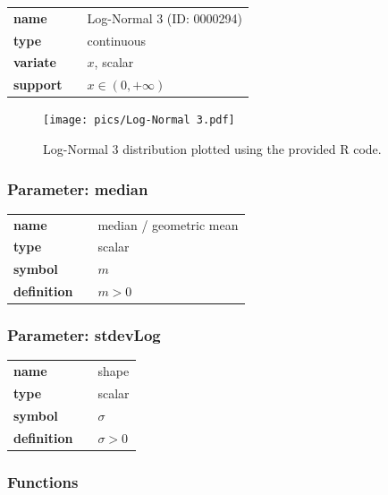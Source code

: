 \documentclass{article}
\begin{document}
  \bigskip 

\begin{tabular}{p{2cm}cl}
\textbf{name} & & Log-Normal 3 (ID: 0000294)\\ 
 
\textbf{type} & & continuous \\ 

\textbf{variate} & & $x$, scalar \\ 

\textbf{support} & & $x \in (0,+\infty)$
\end{tabular}

\begin{figure}[ht!]
\centering
  \texttt{[image: pics/Log-Normal 3.pdf]}
 \caption{Log-Normal 3 distribution plotted using the provided R code.}
 \label{fig:Log-Normal 3}
\end{figure}

\subsubsection*{Parameter: median}

\noindent\begin{tabular}{p{2cm}cl}
\textbf{name} & & median / geometric mean \\
\textbf{type} & & scalar \\
\textbf{symbol} & & $m$  \\
\textbf{definition} & & $m>0$
\end{tabular}
\subsubsection*{Parameter: stdevLog}

\noindent\begin{tabular}{p{2cm}cl}
\textbf{name} & & shape \\
\textbf{type} & & scalar \\
\textbf{symbol} & & $\sigma$  \\
\textbf{definition} & & $\sigma > 0$
\end{tabular}
\subsubsection*{Functions}
\end{document}
